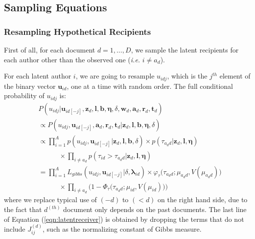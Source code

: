 \documentclass[twoside]{article}
\begin{document}
  	 \subsection{Sampling Equations}\label{subsec:Sampling Equations}
  	   \subsubsection{Resampling Hypothetical Recipients} \label{subsec: Resampling Hypothetical Recipients}
  	   First of all, for each document $d=1,\ldots, D$, we sample the latent recipients for each author other than the observed one (\textit{i.e.} $i \neq a_d$). 
  	   
  	   For each latent author $i$, we are going to resample $u_{idj}$, which is the $j^{th}$ element of the binary vector $\boldsymbol{u}_{id}$, one at a time with random order. The full conditional probability of $u_{idj}$ is:
  	   \begin{equation*}
  	   \begin{aligned}
  	   & P(u_{idj}|\boldsymbol{u}_{id[-j]},  \boldsymbol{z}_d,\boldsymbol{l},\boldsymbol{b}, \boldsymbol{\eta}, \delta, \boldsymbol{w}_d, \boldsymbol{a}_d, \boldsymbol{r}_d, \boldsymbol{t}_d)
\\&\propto P(u_{idj}, \boldsymbol{u}_{id[-j]}, \boldsymbol{a}_d, \boldsymbol{r}_d, \boldsymbol{t}_d| \boldsymbol{z}_d,\boldsymbol{l},\boldsymbol{b}, \boldsymbol{\eta}, \delta)
  	   \\&\propto \prod_{i=1}^A p(u_{idj}, \boldsymbol{u}_{id[-j]}|\boldsymbol{z}_d,\boldsymbol{l}, \boldsymbol{b}, \delta)\times p(\tau_{a_d d}|\boldsymbol{z}_d,\boldsymbol{l}, \boldsymbol{\eta})\\&\quad\quad\quad \times \prod_{i\neq a_d} p(\tau_{id} >\tau_{a_d d}|\boldsymbol{z}_d,\boldsymbol{l}, \boldsymbol{\eta}) \\& 
  	   = \prod_{i=1}^A L_{gibbs}(u_{idj}, \boldsymbol{u}_{id[-j]}| \delta, \boldsymbol{\lambda}_{id} )\times \varphi_{\tau}\big(\tau_{a_d d}; \mu_{a_d d}, V(\mu_{a_d d})\big)\\&\quad\quad\quad \times  \prod_{i\neq a_d}\Big(1-\Phi_{\tau} \big(\tau_{a_d d}; \mu_{i d}, V(\mu_{i d})\big) \Big)
  	     	   \end{aligned}\label{eqn:latentreceiver}
  	   \end{equation*}
  	   where we replace typical use of $(-d)$ to $(<d)$ on the right hand side, due to the fact that $d^{(th)}$ document only depends on the past documents. The last line of Equation (\ref{eqn:latentreceiver}) is obtained by dropping the terms that do not include $J^{(d)}_{ij}$, such as the normalizing constant of Gibbs measure. 
  	   
\end{document}
